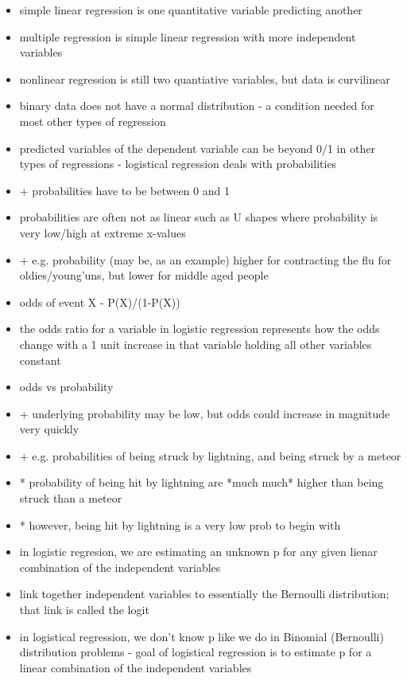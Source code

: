 \documentclass[12pt]{article}
\begin{document}
\begin{itemize}
    \item simple linear regression is one quantitative variable predicting another 
    \item multiple regression is simple linear regression with more independent variables 
    \item nonlinear regression is still two quantiative variables, but data is curvilinear 
    \item binary data does not have a normal distribution - a condition needed for most other types of regression 
    \item predicted variables of the dependent variable can be beyond 0/1 in other types of regressions - logistical regression deals with probabilities 
    \item   + probabilities have to be between 0 and 1 
    \item probabilities are often not as linear such as U shapes where probability is very low/high at extreme x-values
    \item   + e.g. probability (may be, as an example) higher for contracting the flu for oldies/young'uns, but lower for middle aged people
    \item odds of event X - P(X)/(1-P(X))
    \item the odds ratio for a variable in logistic regression represents how the odds change with a 1 unit increase in that variable holding all other variables constant
    \item odds vs probability
    \item   + underlying probability may be low, but odds could increase in magnitude very quickly
    \item   + e.g. probabilities of being struck by lightning, and being struck by a meteor
    \item       * probability of being hit by lightning are *much much* higher than being struck than a meteor
    \item       * however, being hit by lightning is a very low prob to begin with
    \item in logistic regresion, we are estimating an unknown p for any given lienar combination of the independent variables
    \item link together independent variables to essentially the Bernoulli distribution; that link is called the logit
    \item in logistical regression, we don't know p like we do in Binomial (Bernoulli) distribution problems - goal of logistical regression is to estimate p for a linear combination of the independent variables

\end{itemize}
\end{document}
